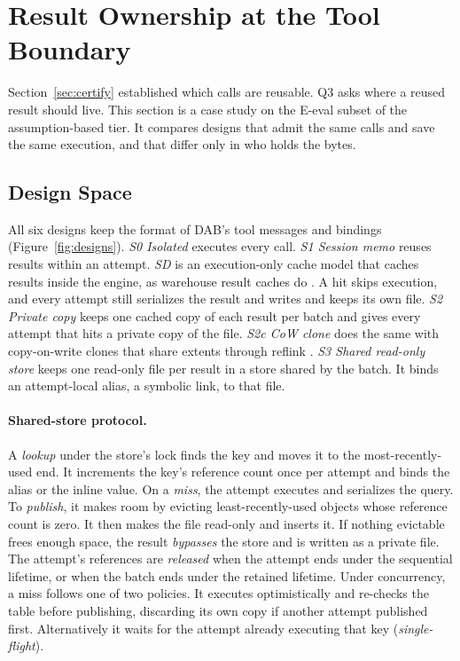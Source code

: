 \section{Result Ownership at the Tool Boundary}
\label{sec:ownership}

Section~\ref{sec:certify} established which calls are reusable. Q3 asks where a reused result should live. This
section is a case study on the E-eval subset of the assumption-based tier. It compares designs that admit the same
calls and save the same execution, and that differ only in who holds the bytes.



\subsection{Design Space}
\label{sec:designs}

All six designs keep the format of DAB's tool messages and bindings (Figure~\ref{fig:designs}). \emph{S0 Isolated}
executes every call. \emph{S1 Session memo} reuses results within an attempt. \emph{SD} is an execution-only cache
model that caches results inside the engine, as warehouse result caches do
\cite{snowflake2026persisted,google2026bqcache,databricks2026querycache}. A hit skips execution, and every attempt
still serializes the result and writes and keeps its own file. \emph{S2 Private copy} keeps one cached copy of each
result per batch and gives every attempt that hits a private copy of the file. \emph{S2c CoW clone} does the same
with copy-on-write clones that share extents through reflink \cite{rodeh2013btrfs}. \emph{S3 Shared read-only store}
keeps one read-only file per result in a store shared by the batch. It binds an attempt-local alias, a symbolic link,
to that file. 

\paragraph{Shared-store protocol.}
A \emph{lookup} under the store's lock finds the key and moves it to the most-recently-used end. It increments the
key's reference count once per attempt and binds the alias or the inline value. On a \emph{miss}, the attempt
executes and serializes the query. To \emph{publish}, it makes room by evicting least-recently-used objects whose
reference count is zero. It then makes the file read-only and inserts it. If nothing evictable frees enough space,
the result \emph{bypasses} the store and is written as a private file. The attempt's references are \emph{released}
when the attempt ends under the sequential lifetime, or when the batch ends under the retained lifetime. Under
concurrency, a miss follows one of two policies. It executes optimistically and re-checks the table before
publishing, discarding its own copy if another attempt published first. Alternatively it waits for the attempt
already executing that key (\emph{single-flight}).

